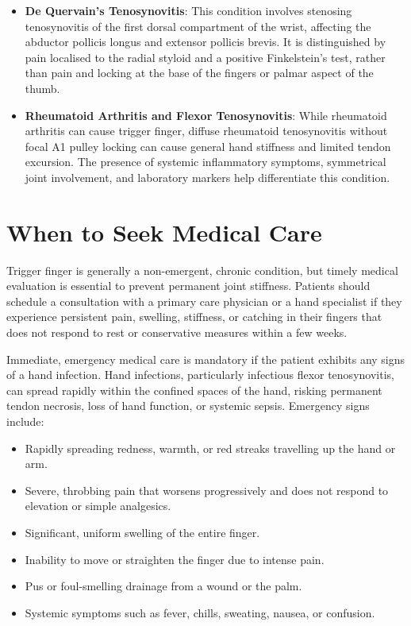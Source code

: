 \begin{itemize}
  \item \textbf{De Quervain's Tenosynovitis}: This condition involves stenosing tenosynovitis of the first dorsal compartment of the wrist, affecting the abductor pollicis longus and extensor pollicis brevis. It is distinguished by pain localised to the radial styloid and a positive Finkelstein's test, rather than pain and locking at the base of the fingers or palmar aspect of the thumb.
  \item \textbf{Rheumatoid Arthritis and Flexor Tenosynovitis}: While rheumatoid arthritis can cause trigger finger, diffuse rheumatoid tenosynovitis without focal A1 pulley locking can cause general hand stiffness and limited tendon excursion. The presence of systemic inflammatory symptoms, symmetrical joint involvement, and laboratory markers help differentiate this condition.
\end{itemize}

\section*{When to Seek Medical Care}
Trigger finger is generally a non-emergent, chronic condition, but timely medical evaluation is essential to prevent permanent joint stiffness. Patients should schedule a consultation with a primary care physician or a hand specialist if they experience persistent pain, swelling, stiffness, or catching in their fingers that does not respond to rest or conservative measures within a few weeks.

Immediate, emergency medical care is mandatory if the patient exhibits any signs of a hand infection. Hand infections, particularly infectious flexor tenosynovitis, can spread rapidly within the confined spaces of the hand, risking permanent tendon necrosis, loss of hand function, or systemic sepsis. Emergency signs include:
\begin{itemize}
  \item Rapidly spreading redness, warmth, or red streaks travelling up the hand or arm.
  \item Severe, throbbing pain that worsens progressively and does not respond to elevation or simple analgesics.
  \item Significant, uniform swelling of the entire finger.
  \item Inability to move or straighten the finger due to intense pain.
  \item Pus or foul-smelling drainage from a wound or the palm.
  \item Systemic symptoms such as fever, chills, sweating, nausea, or confusion.
\end{itemize}

